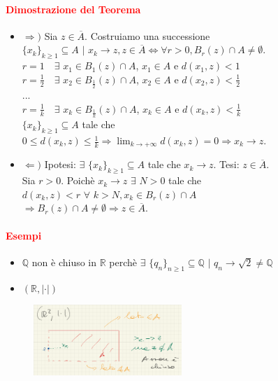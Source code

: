 \documentclass{article}
\newcommand{\R}{\mathbb{R}}
\newcommand{\Q}{\mathbb{Q}}
\begin{document}
\paragraph{\textcolor{red}{Dimostrazione del Teorema}}
\begin{itemize}
    \item $\Rightarrow ) $ Sia $z \in \overline{A}$. Costruiamo una successione $\{x_k\}_{k \geq 1} \subseteq A \,\,|\,\, x_k \rightarrow z, z\in \overline{A} \Leftrightarrow \forall r >0, B_r(z)\cap A \neq \emptyset$.\\
    $r=1\,\,\,\,\,\, \exists\,\, x_1 \in B_1(z) \cap A$, $x_1 \in A$ e $d(x_1,z)<1$\\
    $r=\frac{1}{2}\,\,\,\,\,\, \exists \,\,x_2 \in B_{\frac{1}{2}}(z) \cap A$, $ x_2 \in A $ e $ d(x_2,z)< \frac{1}{2}$\\
    ...\\
    $r=\frac{1}{k}\,\,\,\,\,\, \exists\,\, x_k \in B_{\frac{1}{k}}(z)\cap A$, $ x_k \in A $ e $ d(x_k,z)< \frac{1}{k}$\\
    $\{x_k\}_{k \geq 1} \subseteq A$ tale che $0 \leq d(x_k,z)\leq \frac{1}{k} \Rightarrow \lim_{k \rightarrow +\infty} d(x_k,z)=0 \Rightarrow x_k \rightarrow z$.
    \item $\Leftarrow )$ Ipotesi: $\exists \,\, \{x_k\}_{k\geq 1} \subseteq A$ tale che $x_k \rightarrow z$. Tesi: $z \in \overline{A}$.\\
    Sia $r >0$. Poichè $x_k \rightarrow z \,\, \exists \,\, N> 0$ tale che $d(x_k,z)<r\,\, \forall \,\, k > N, x_k \in B_r(z) \cap A$\\
    $ \Rightarrow B_r(z) \cap A \neq \emptyset \Rightarrow z \in \overline{A}$. 
\end{itemize}
\begin{flushright}
\large\Lightning
\end{flushright}

\paragraph{\textcolor{red}{Esempi}}
\begin{itemize}
    \item $\Q$ non è chiuso in  $\R$ perchè $\exists \,\, \{q_n\}_{n\geq 1} \subseteq \Q \,\,|\,\, q_n \rightarrow \sqrt{2} \neq \Q$
    \item $(\R, |\cdot|)$
\end{itemize}
    \begin{figure}[!h]
        \centering
        \includegraphics[width=0.5\textwidth]{Screenshot from 2023-03-28 18-09-08}
    \end{figure}
\end{document}
